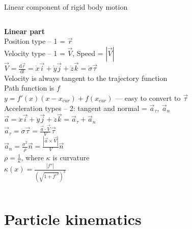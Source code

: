 \documentclass[aspectratio=169,xcolor=table,10pt, notes=hide]{beamer}
\begin{document}
    \begin{frame}[t]{Linear component of rigid body motion}
        \footnotesize
        \begin{columns}[T,onlytextwidth]
            \begin{column}{0.49\textwidth}
                \textbf{Linear part} \\
        Position type -- 1 = $\vec{r}$ \\
        Velocity type -- 1 = $\vec{V}$, Speed =  $|\vec{V}|$ \\        
        $\vec{V} = \frac{\mathrm{d} \vec{r}}{\mathrm{d} t} = \dot{x}\vec{i} + \dot{y}\vec{j} + \dot{z}\vec{k} = \dot{\sigma}\vec{\tau} $ \\ 
        Velocity is always tangent to the trajectory function \\
        Path function is $f$ \\
        $y = f'(x)(x-x_{cur})+f(x_{cur})$ --- easy to convert to $\vec{\tau}$ \\
        Acceleration types -- 2: tangent and normal = $\vec{a}_{\tau},\ \vec{a}_{n}$ \\
        $\vec{a} = \ddot{x}\vec{i} + \ddot{y}\vec{j} + \ddot{z}\vec{k} = \vec{a}_{\tau} + \vec{a}_{n} $\\
        $\vec{a}_{\tau} = \ddot{\sigma} \vec{\tau} = \frac{\vec{a} \cdot \vec{V}}{V} \vec{\tau}$ \\
        $\vec{a}_{n} = \frac{\dot{\sigma}^2}{\rho}\vec{n} =\frac{|\vec{a} \times \vec{V}|}{V}\vec{n}$\\
        $\rho = \frac{1}{\kappa}$, where $\kappa$ is curvature \\        
        $\kappa (x)=\frac {|f''|}{({\sqrt {1+f'^{2}}})^{3}}$
            \end{column}
        \end{columns}
        
                \end{frame}

\section*{Particle kinematics}
\end{document}
